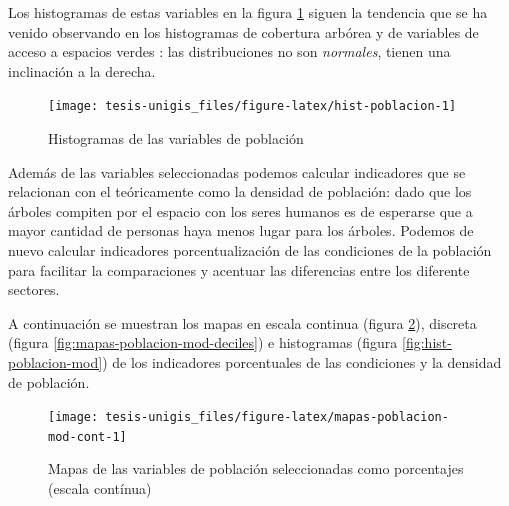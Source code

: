 \documentclass[12pt,]{book}
\begin{document}
Los histogramas de estas variables en la figura \ref{fig:hist-poblacion}
siguen la tendencia que se ha venido observando en los histogramas de
cobertura arbórea y de variables de acceso a espacios verdes : las
distribuciones no son \emph{normales}, tienen una inclinación a la
derecha.

\begin{figure}
\texttt{[image: tesis-unigis\_files/figure-latex/hist-poblacion-1]} \caption{Histogramas de las variables de población }\label{fig:hist-poblacion}
\end{figure}

Además de las variables seleccionadas podemos calcular indicadores que
se relacionan con el teóricamente como la densidad de población: dado
que los árboles compiten por el espacio con los seres humanos es de
esperarse que a mayor cantidad de personas haya menos lugar para los
árboles. Podemos de nuevo calcular indicadores porcentualización de las
condiciones de la población para facilitar la comparaciones y acentuar
las diferencias entre los diferente sectores.

A continuación se muestran los mapas en escala continua (figura
\ref{fig:mapas-poblacion-mod-cont}), discreta (figura
\ref{fig:mapas-poblacion-mod-deciles}) e histogramas (figura
\ref{fig:hist-poblacion-mod}) de los indicadores porcentuales de las
condiciones y la densidad de población.

\begin{figure}
\texttt{[image: tesis-unigis\_files/figure-latex/mapas-poblacion-mod-cont-1]} \caption{Mapas de las variables de población seleccionadas como porcentajes (escala contínua)}\label{fig:mapas-poblacion-mod-cont}
\end{figure}
\end{document}
